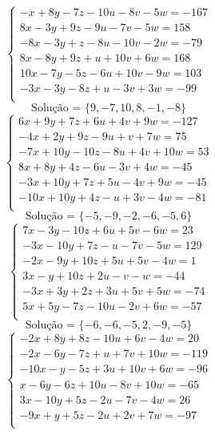 \documentclass[12pt,oneside,a4paper]{article}
\begin{document}
\vspace{\baselineskip}
\begin{equation*}
\begin{cases}
-x+8y-7z-10u-8v-5w=-167 \\
8x-3y+9z-9u-7v-5w=158 \\
-8x-3y+z-8u-10v-2w=-79 \\
8x-8y+9z+u+10v+6w=168 \\
10x-7y-5z-6u+10v-9w=103 \\
-3x-3y-8z+u-3v+3w=-99 \\
\end{cases}
\end{equation*}
\begin{equation*}
\text{Solução = }\{9,-7,10,8,-1,-8\}
\end{equation*}
\vspace{\baselineskip}
\begin{equation*}
\begin{cases}
6x+9y+7z+6u+4v+9w=-127 \\
-4x+2y+9z-9u+v+7w=75 \\
-7x+10y-10z-8u+4v+10w=53 \\
8x+8y+4z-6u-3v+4w=-45 \\
-3x+10y+7z+5u-4v+9w=-45 \\
-10x+10y+4z-u+3v-4w=-81 \\
\end{cases}
\end{equation*}
\begin{equation*}
\text{Solução = }\{-5,-9,-2,-6,-5,6\}
\end{equation*}
\vspace{\baselineskip}
\begin{equation*}
\begin{cases}
7x-3y-10z+6u+5v-6w=23 \\
-3x-10y+7z-u-7v-5w=129 \\
-2x-9y+10z+5u+5v-4w=1 \\
3x-y+10z+2u-v-w=-44 \\
-3x+3y+2z+3u+5v+5w=-74 \\
5x+5y-7z-10u-2v+6w=-57 \\
\end{cases}
\end{equation*}
\begin{equation*}
\text{Solução = }\{-6,-6,-5,2,-9,-5\}
\end{equation*}
\vspace{\baselineskip}
\begin{equation*}
\begin{cases}
-2x+8y+8z-10u+6v-4w=20 \\
-2x-6y-7z+u+7v+10w=-119 \\
-10x-y-5z+3u+10v+6w=-96 \\
x-6y-6z+10u-8v+10w=-65 \\
3x-10y+5z-2u-7v-4w=26 \\
-9x+y+5z-2u+2v+7w=-97 \\
\end{cases}
\end{equation*}
\end{document}
